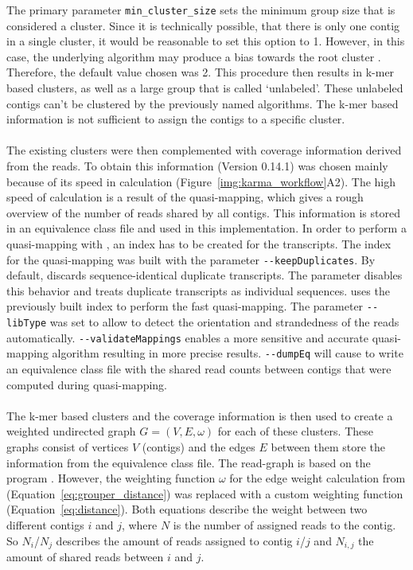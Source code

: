 \documentclass[12pt,a4paper,english]{article}
\begin{document}
	The primary parameter \texttt{min\_cluster\_size} sets the minimum group size that is considered a cluster. Since it is technically possible, that there is only one contig in a single cluster, it would be reasonable to set this option to 1. However, in this case, the underlying algorithm may produce a bias towards the root cluster \citep{hdbscan}. Therefore, the default value chosen was 2.
	This procedure then results in k-mer based clusters, as well as a large group that is called `unlabeled'. These unlabeled contigs can't be clustered by the previously named algorithms. The k-mer based information is not sufficient to assign the contigs to a specific cluster. \\
	\\
	The existing clusters were then complemented with coverage information derived from the reads. To obtain this information \salmon (Version 0.14.1) \citep{salmon:17} was chosen mainly because of its speed in calculation (Figure~\ref{img:karma_workflow}A2). 
	The high speed of calculation is a result of the quasi-mapping, which gives a rough overview of the number of reads shared by all contigs. This information is stored in an equivalence class file and used in this implementation.
	In order to perform a quasi-mapping with \salmon, an index has to be created for the transcripts. The index for the quasi-mapping was built with the parameter \texttt{-{}-keepDuplicates}. By default, \salmon discards sequence-identical duplicate transcripts. The parameter disables this behavior and treats duplicate transcripts as individual sequences.
	\salmon uses the previously built index to perform the fast quasi-mapping. The parameter \texttt{-{}-libType} was set to allow \salmon to detect the orientation and strandedness of the reads automatically.
	\texttt{-{}-validateMappings} enables a more sensitive and accurate quasi-mapping algorithm resulting in more precise results. \texttt{-{}-dumpEq} will cause \salmon to write an equivalence class file with the shared read counts between contigs that were computed during quasi-mapping.\\
\\
	The k-mer based clusters and the coverage information is then used to create a weighted undirected graph $ G = (V, E, \omega) $ for each of these clusters. These graphs consist of vertices $V$ (contigs) and the edges $E$ between them store the information from the \salmon equivalence class file. The read-graph is based on the program \grouper \citep{Grouper:18}. However, the weighting function $\omega$ for the edge weight calculation from \grouper (Equation~\ref{eq:grouper_distance}) was replaced with a custom weighting function (Equation~\ref{eq:distance}). Both equations describe the weight between two different contigs $ i $ and $ j $, where $ N $ is the number of assigned reads to the contig. So $N_{i}$/$N_{j}$ describes the amount of reads assigned to contig $i$/$j$ and $ N_{i,j}$ the amount of shared reads between $i$ and $j$.
\end{document}
